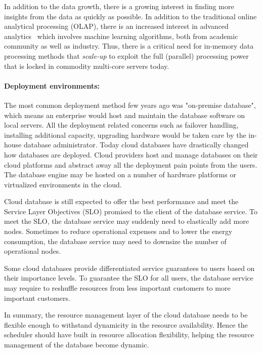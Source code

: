 In addition to the data growth, there is a growing interest in finding more insights from the data as quickly as possible.
In addition to the traditional online analytical processing (OLAP), there is an increased interest in advanced analytics~\cite{DBLP:conf/sigmod/Kumar0017} which involves machine learning algorithms, both from academic community as well as industry. 
Thus, there is a critical need for in-memory data processing methods that \textit{scale-up} to exploit the full (parallel) processing power that is locked in commodity multi-core servers today.

\paragraph{Deployment environments:} 
The most common deployment method few years ago was "on-premise database", which means an enterprise would host and maintain the database software on local servers. 
All the deployment related concerns such as failover handling, installing additional capacity, upgrading hardware would be taken care by the in-house database administrator. 
Today cloud databases have drastically changed how databases are deployed.
Cloud providers host and manage databases on their cloud platforms and abstract away all the deployment pain points from the users.
The database engine may be hosted on a number of hardware platforms or virtualized environments in the cloud.

Cloud database is still expected to offer the best performance and meet the Service Layer Objectives (SLO) promised to the client of the database service. 
To meet the SLO, the database service may suddenly need to elastically add more nodes. Sometimes to reduce operational expenses and to lower the energy consumption, the database service may need to downsize the number of operational nodes.

Some cloud databases provide differentiated service guarantees to users based on their importance levels. 
To guarantee the SLO for all users, the database service may require to reshuffle resources from less important customers to more important customers. 

In summary, the resource management layer of the cloud database needs to be flexible enough to withstand dynamicity in the resource availability.
Hence the scheduler should have built in resource allocation flexibility, helping the resource management of the database become dynamic.